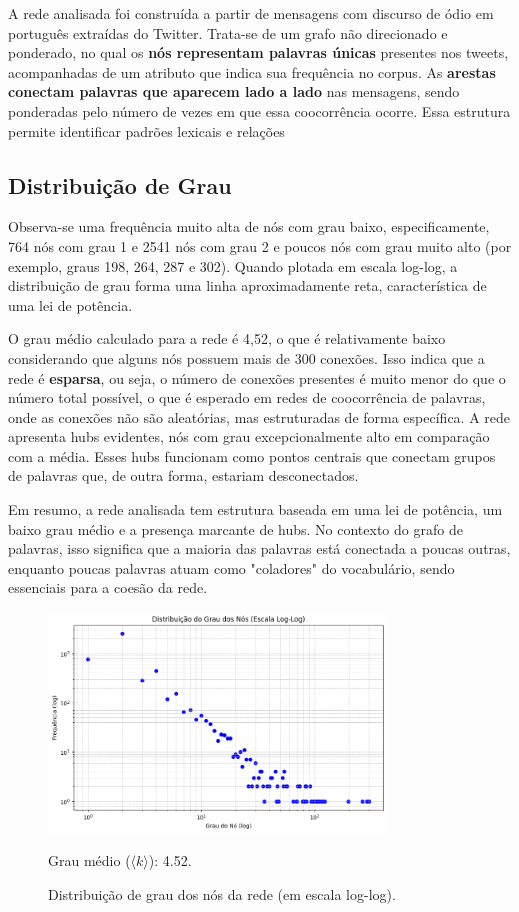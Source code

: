 \documentclass[12pt, a4paper]{article}
\begin{document}
A rede analisada foi construída a partir de mensagens com discurso de ódio em português extraídas do Twitter. Trata-se de um grafo não direcionado e ponderado, no qual os \textbf{nós representam palavras únicas} presentes nos tweets, acompanhadas de um atributo que indica sua frequência no corpus. As \textbf{arestas conectam palavras que aparecem lado a lado} nas mensagens, sendo ponderadas pelo número de vezes em que essa coocorrência ocorre. Essa estrutura permite identificar padrões lexicais e relações 


\subsection{Distribuição de Grau}
Observa-se uma frequência muito alta de nós com grau baixo, especificamente, 764 nós com grau 1 e 2541 nós com grau 2 e poucos nós com grau muito alto (por exemplo, graus 198, 264, 287 e 302). Quando plotada em escala log-log, a distribuição de grau forma uma linha aproximadamente reta, característica de uma lei de potência.

O grau médio calculado para a rede é 4,52, o que é relativamente baixo considerando que alguns nós possuem mais de 300 conexões. Isso indica que a rede é \textbf{esparsa}, ou seja, o número de conexões presentes é muito menor do que o número total possível, o que é esperado em redes de coocorrência de palavras, onde as conexões não são aleatórias, mas estruturadas de forma específica. A rede apresenta hubs evidentes, nós com grau excepcionalmente alto em comparação com a média. Esses hubs funcionam como pontos centrais que conectam grupos de palavras que, de outra forma, estariam desconectados. 

Em resumo, a rede analisada tem estrutura baseada em uma lei de potência, um baixo grau médio e a presença marcante de hubs. No contexto do grafo de palavras, isso significa que a maioria das palavras está conectada a poucas outras, enquanto poucas palavras atuam como "coladores" do vocabulário, sendo essenciais para a coesão da rede. 
\begin{figure}[H]
    \centering
    \includegraphics[width=0.8\textwidth]{grauno.png}
    \caption{Distribuição de grau dos nós da rede (em escala log-log).}
    \label{fig:dist_grau}
    Grau médio ($\langle k \rangle$): 4.52.
\end{figure}
\end{document}
